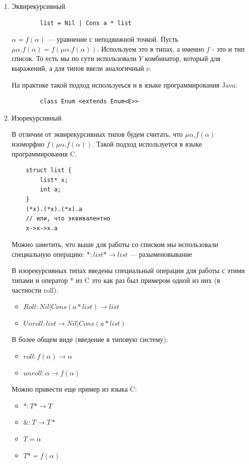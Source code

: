 \documentclass[12pt]{article}
\begin{document}
\begin{enumerate}
    \item Эквирекурсивный 
    \begin{verbatim}
        list = Nil | Cons a * list
    \end{verbatim}
    $\alpha = f(\alpha)$ --- уравнение с неподвижной точкой. Пусть $\mu \alpha. f(\alpha) = f(\mu \alpha.f(\alpha))$. Используем это в типах, а именно $f$ - это и тип список. То есть мы по сути использовали $Y$ комбинатор, который для выражений, а для типов ввели аналогичный $\nu$.
    
    На практике такой подход используеься и в языке программирования Java:
    
    \begin{verbatim}
        class Enum <extends Enum<E>>
    \end{verbatim}
    
    \item Изорекурсивный
    
    В отличии от эквирекурсивных типов будем считать, что $\mu \alpha. f(\alpha)$ изоморфно $f(\mu \alpha.f(\alpha))$. Такой подход используется в языке программирования C.
    \begin{verbatim}
    struct list {
        list* x;
        int a;
    }
    (*x).(*x).(*x).a
    // или, что эквивалентно
    x->x->x.a
    \end{verbatim}
    
    Можно заметить, что выше для работы со списком мы использовали специальную операцию:
    $*: list* \rightarrow list$ --- разыменовывание 
    
    В изорекурсивных типах введены специальный операции для работы с этими типами и оператор * из C это как раз был примером одной из них (в частности roll):
    \begin{itemize}
        \item $Roll: Nil | Cons (a * list) \rightarrow list$
        \item $Unroll: list \rightarrow Nil | Cons (a * list)$
    \end{itemize}
    
    В более общем виде (введение в типовую систему): 
    \begin{itemize}
        \item $roll: f(\alpha) \rightarrow \alpha$
        \item $unroll: \alpha \rightarrow f(\alpha)$
    \end{itemize}
    
    Можно привести еще пример из языка C:
    \begin{itemize}
        \item $*: T* \rightarrow T$
        \item $\&: T \rightarrow T*$
        \item $T = \alpha$
        \item $T* = f(\alpha)$
    \end{itemize}
    
\end{enumerate}
\end{document}
